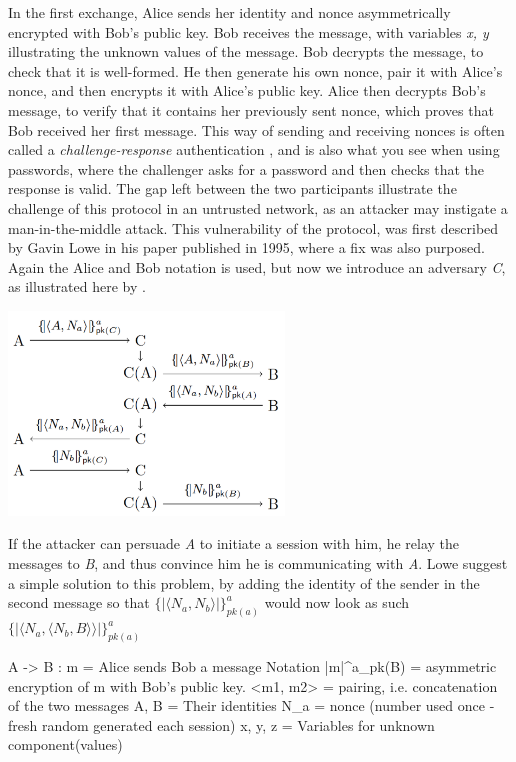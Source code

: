 In the first exchange, Alice sends her identity and nonce asymmetrically encrypted with Bob's public key. Bob receives the message, with variables \textit{x, y} illustrating the unknown values of the message. Bob decrypts the message, to check that it is well-formed. He then generate his own nonce, pair it with Alice's nonce, and then encrypts it with Alice's public key. Alice then decrypts Bob's message, to verify that it contains her previously sent nonce, which proves that Bob received her first message. 
This way of sending and receiving nonces is often called a \textit{challenge-response} authentication \autocite{DBLP:journals/ftpl/CortierK14}, and is also what you see when using passwords, where the challenger asks for a password and then checks that the response is valid. 
\bigbreak
The gap left between the two participants illustrate the challenge of this protocol in an untrusted network, as an attacker may instigate a man-in-the-middle attack. This vulnerability of the protocol, was first described by Gavin Lowe in his paper published in 1995, where a fix was also purposed. Again the Alice and Bob notation is used, but now we introduce an adversary \textit{C}, as illustrated here by \citeauthor{DBLP:journals/ftpl/CortierK14}.

\begin{center}
\includegraphics[width=0.55\textwidth, angle=0]{Graphics/Challenge.pdf}
\end{center}

If the attacker can persuade \textit{A} to initiate a session with him, he relay the messages to \textit{B}, and thus convince him he is communicating with \textit{A}. Lowe suggest a simple solution to this problem, by adding the identity of the sender in the second message so that $\{|\langle N_a, N_b\rangle |\}^a_{pk(a)}$ would now look as such $\{|\langle N_a, \langle N_b, B\rangle \rangle |\}^a_{pk(a)}$


\iffalse
A -> B : m  			= Alice sends Bob a message
Notation {|m|}^a_pk(B) 	= asymmetric encryption of m with Bob's public key. 
<m1, m2>				= pairing, i.e. concatenation of the two messages
A, B					= Their identities
N_a					= nonce (number used once - fresh random generated each session)
x, y, z				= Variables for unknown component(values)


